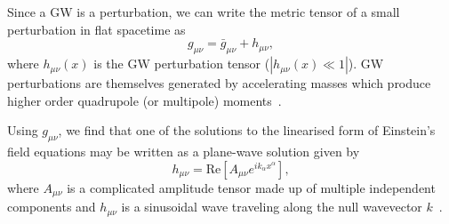Since a \ac{GW} is a perturbation, we can write the metric tensor 
of a small perturbation in flat spacetime as 
%
\begin{equation}
    g_{\mu \nu} = \bar{g}_{\mu \nu} + h_{\mu \nu},
\end{equation}{}
%
where $h_{\mu \nu}(x)$ is the \ac{GW} perturbation tensor ($|h_{\mu \nu}(x) \ll 1|$). 
%
%
%
%
%
%
\ac{GW} perturbations are themselves generated by 
accelerating masses which produce 
higher order quadrupole (or multipole) moments~\cite{Maggiore:2007ulw}.

Using $g_{\mu\nu}$, we find that one of the solutions to the linearised 
form of Einstein's field equations may be written as a plane-wave 
solution given by
%
\begin{equation}\label{eq:gw_plane_solution}
    h_{\mu\nu} = \textrm{Re}[A_{\mu\nu} e^{ik_{\alpha}x^{\alpha}}],
\end{equation}{}
%
where $A_{\mu\nu}$ is a complicated amplitude tensor made up 
of multiple independent components and $h_{\mu \nu}$ is a sinusoidal 
wave traveling along the null wavevector $k$~\cite{Maggiore:2007ulw}.

